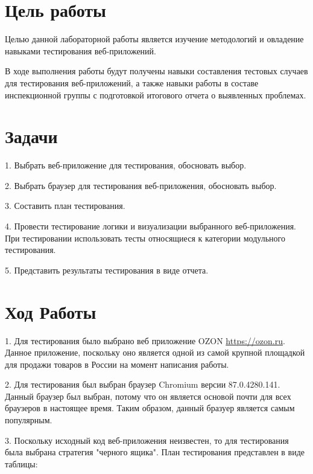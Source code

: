 \documentclass[12pt]{article}
\begin{document}
    \section*{Цель работы}

    Целью данной лабораторной работы является изучение методологий и овладение навыками тестирования веб-приложений.

    В ходе выполнения работы будут получены навыки составления тестовых случаев для тестирования веб-приложений, а также навыки работы в составе инспекционной группы с подготовкой итогового отчета о выявленных проблемах.

    \section*{Задачи}

    1. Выбрать веб-приложение для тестирования, обосновать выбор.

    2. Выбрать браузер для тестирования веб-приложения, обосновать выбор.

    3. Составить план тестирования.

    4. Провести тестирование логики и визуализации выбранного веб-приложения. При тестировании   использовать   тесты   относящиеся   к   категории модульного тестирования.

    5. Представить результаты тестирования в виде отчета.

    \section*{Ход Работы}
    1. Для тестирования было выбрано веб приложение OZON \url{https://ozon.ru}. Данное приложение, поскольку оно является одной из самой крупной площадкой для продажи товаров в России на момент написания работы.

    2. Для тестирования был выбран браузер Chromium версии 87.0.4280.141. Данный браузер был выбран, потому что он является основой почти для всех браузеров в настоящее время. Таким образом, данный бразуер является самым популярным.

    3. Поскольку исходный код веб-приложения неизвестен, то для тестирования была выбрана стратегия "черного ящика". План тестирования представлен в виде таблицы:
\end{document}
